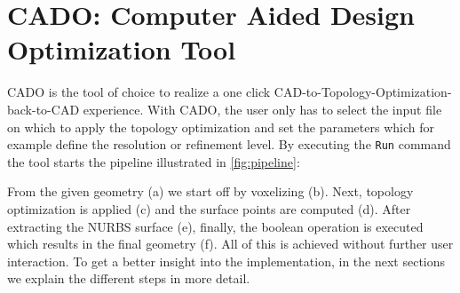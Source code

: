 \section{CADO: Computer Aided Design Optimization Tool}
CADO is the tool of choice to realize a one click CAD-to-Topology-Optimization-back-to-CAD experience. With CADO, the user only has to select the input file on which to apply the topology optimization and set the parameters which for example define the resolution or refinement level. By executing the \texttt{Run} command the tool starts the pipeline illustrated in \autoref{fig:pipeline}: 

From the given geometry (a) we start off by voxelizing (b). Next, topology optimization is applied (c) and the surface points are computed (d). After extracting the NURBS surface (e), finally, the boolean operation is executed which results in the final geometry (f). All of this is achieved without further user interaction. To get a better insight into the implementation, in the next sections we explain the different steps in more detail.
